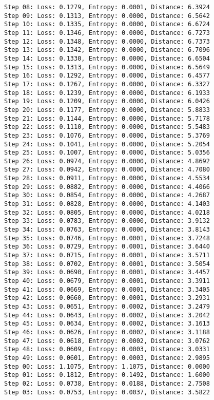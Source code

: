 \documentclass[11pt]{article}
\begin{document}
\begin{Verbatim}[commandchars=\\\{\}]
Step 08: Loss: 0.1279, Entropy: 0.0001, Distance: 6.3924
Step 09: Loss: 0.1313, Entropy: 0.0000, Distance: 6.5642
Step 10: Loss: 0.1335, Entropy: 0.0000, Distance: 6.6724
Step 11: Loss: 0.1346, Entropy: 0.0000, Distance: 6.7273
Step 12: Loss: 0.1348, Entropy: 0.0000, Distance: 6.7373
Step 13: Loss: 0.1342, Entropy: 0.0000, Distance: 6.7096
Step 14: Loss: 0.1330, Entropy: 0.0000, Distance: 6.6504
Step 15: Loss: 0.1313, Entropy: 0.0000, Distance: 6.5649
Step 16: Loss: 0.1292, Entropy: 0.0000, Distance: 6.4577
Step 17: Loss: 0.1267, Entropy: 0.0000, Distance: 6.3327
Step 18: Loss: 0.1239, Entropy: 0.0000, Distance: 6.1933
Step 19: Loss: 0.1209, Entropy: 0.0000, Distance: 6.0426
Step 20: Loss: 0.1177, Entropy: 0.0000, Distance: 5.8833
Step 21: Loss: 0.1144, Entropy: 0.0000, Distance: 5.7178
Step 22: Loss: 0.1110, Entropy: 0.0000, Distance: 5.5483
Step 23: Loss: 0.1076, Entropy: 0.0000, Distance: 5.3769
Step 24: Loss: 0.1041, Entropy: 0.0000, Distance: 5.2054
Step 25: Loss: 0.1007, Entropy: 0.0000, Distance: 5.0356
Step 26: Loss: 0.0974, Entropy: 0.0000, Distance: 4.8692
Step 27: Loss: 0.0942, Entropy: 0.0000, Distance: 4.7080
Step 28: Loss: 0.0911, Entropy: 0.0000, Distance: 4.5534
Step 29: Loss: 0.0882, Entropy: 0.0000, Distance: 4.4066
Step 30: Loss: 0.0854, Entropy: 0.0000, Distance: 4.2687
Step 31: Loss: 0.0828, Entropy: 0.0000, Distance: 4.1403
Step 32: Loss: 0.0805, Entropy: 0.0000, Distance: 4.0218
Step 33: Loss: 0.0783, Entropy: 0.0000, Distance: 3.9132
Step 34: Loss: 0.0763, Entropy: 0.0000, Distance: 3.8143
Step 35: Loss: 0.0746, Entropy: 0.0001, Distance: 3.7248
Step 36: Loss: 0.0729, Entropy: 0.0001, Distance: 3.6440
Step 37: Loss: 0.0715, Entropy: 0.0001, Distance: 3.5711
Step 38: Loss: 0.0702, Entropy: 0.0001, Distance: 3.5054
Step 39: Loss: 0.0690, Entropy: 0.0001, Distance: 3.4457
Step 40: Loss: 0.0679, Entropy: 0.0001, Distance: 3.3911
Step 41: Loss: 0.0669, Entropy: 0.0001, Distance: 3.3405
Step 42: Loss: 0.0660, Entropy: 0.0001, Distance: 3.2931
Step 43: Loss: 0.0651, Entropy: 0.0002, Distance: 3.2479
Step 44: Loss: 0.0643, Entropy: 0.0002, Distance: 3.2042
Step 45: Loss: 0.0634, Entropy: 0.0002, Distance: 3.1613
Step 46: Loss: 0.0626, Entropy: 0.0002, Distance: 3.1188
Step 47: Loss: 0.0618, Entropy: 0.0002, Distance: 3.0762
Step 48: Loss: 0.0609, Entropy: 0.0003, Distance: 3.0331
Step 49: Loss: 0.0601, Entropy: 0.0003, Distance: 2.9895
Step 00: Loss: 1.1075, Entropy: 1.1075, Distance: 0.0000
Step 01: Loss: 0.1812, Entropy: 0.1492, Distance: 1.6000
Step 02: Loss: 0.0738, Entropy: 0.0188, Distance: 2.7508
Step 03: Loss: 0.0753, Entropy: 0.0037, Distance: 3.5822

\end{Verbatim}
\end{document}

